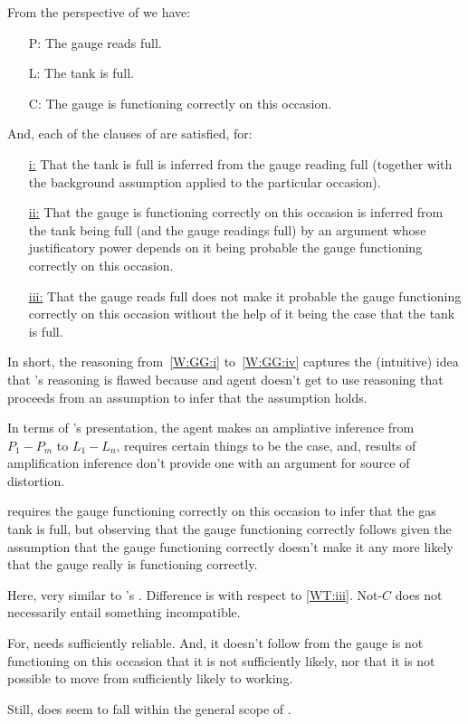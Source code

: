 \begin{note}
  From the perspective of \wnf{} we have:
  \begin{itemize}
  \item[P:] The gauge reads full.
  \item[L:] The tank is full.
  \item[C:] The gauge is functioning correctly on this occasion.
  \end{itemize}

  And, each of the clauses of \wrt{} are satisfied, for:
  \begin{itemize}[labelwidth=]
  \item[{\hyperref[W:NF:i]{i:}}] That the tank is full is inferred from the gauge reading full (together with the background assumption applied to the particular occasion).
  \item[{\hyperref[W:NF:ii]{ii:}}] That the gauge is functioning correctly on this occasion is inferred from the tank being full (and the gauge readings full) by an argument whose justificatory power depends on it being probable the gauge functioning correctly on this occasion.
  \item[{\hyperref[W:NF:iii]{iii:}}] That the gauge reads full does not make it probable the gauge functioning correctly on this occasion without the help of it being the case that the tank is full.
  \end{itemize}

  In short, the reasoning from~\ref{W:GG:i} to~\ref{W:GG:iv} captures the (intuitive) idea that 's reasoning is flawed because and agent doesn't get to use reasoning that proceeds from an assumption to infer that the assumption holds.

  {
    In terms of \citeauthor{Weisberg:2010to}'s presentation, the agent makes an ampliative inference from \(P_{1}-P_{m}\) to \(L_{1}-L_{n}\), requires certain things to be the case, and, results of amplification inference don't provide one with an argument for source of distortion.
    }

   requires the gauge functioning correctly on this occasion to infer that the gas tank is full, but observing that the gauge functioning correctly follows given the assumption that the gauge functioning correctly doesn't make it any more likely that the gauge really is functioning correctly.
\end{note}

\begin{note}
    {
    Here, very similar to \citeauthor{Wright:2011wn}'s \wrt{}.
    Difference is with respect to \ref{WT:iii}.
    Not-\(C\) does not necessarily entail something incompatible.

    For,  needs sufficiently reliable.
    And, it doesn't follow from the gauge is not functioning on this occasion that it is not sufficiently likely, nor that it is not possible to move from sufficiently likely to working.

    Still, \wnf{} does seem to fall within the general scope of \widt{}.
  }
\end{note}

